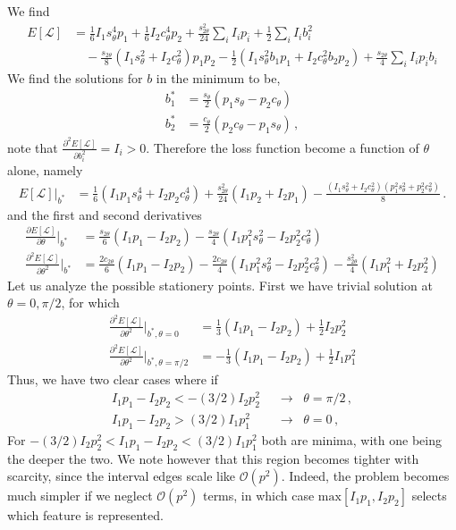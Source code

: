 \documentclass[a4paper]{article}
\begin{document}
We find
\begin{align}
E[\mathcal{L}] &= \frac{1}{6}I_1 s_\theta^4 p_1 + \frac{1}{6}I_2 c_\theta^4 p_2 
+ \frac{s_{2\theta}^2}{24}\sum_i I_i p_{\bar{i}} 
+ \frac{1}{2}\sum_i I_i b_i^2 \nonumber\\
&\quad - \frac{s_{2\theta}}{8}\left(I_1 s_\theta^2 + I_2 c_\theta^2\right)p_1 p_2 
- \frac{1}{2}\left(I_1 s_\theta^2 b_1 p_1 + I_2 c_\theta^2 b_2 p_2\right) 
+ \frac{s_{2\theta}}{4}\sum_i I_i p_{\bar i} b_i
\end{align}
We find the solutions for $b$ in the minimum to be,
\begin{align}
b_1^* &= \frac{s_\theta}{2}(p_1 s_\theta - p_2 c_\theta)\\
b_2^* &= \frac{c_\theta}{2}(p_2 c_\theta - p_1 s_\theta)\,,
\end{align}
note that $\frac{\partial^2 E[\mathcal{L}]}{\partial b_i^2}=I_i>0$. Therefore the loss function become a function of $\theta$ alone, namely
\begin{align}
E[\mathcal{L}]\big|_{b^*} &= \frac{1}{6}(I_1 p_1 s_\theta^4 + I_2 p_2 c_\theta^4) + \frac{s_{2\theta}^2}{24}(I_1 p_2 + I_2 p_1) - \frac{(I_1 s_\theta^2 + I_2 c_\theta^2)(p_1^2 s_\theta^2 + p_2^2 c_\theta^2)}{8}\,.
\end{align}
and the first and second derivatives
\begin{align}
\frac{\partial E[\mathcal{L}]}{\partial\theta}\Bigg|_{b^*} &= \frac{s_{2\theta}}{6}(I_1 p_1 - I_2 p_2) - \frac{s_{2\theta}}{4}(I_1 p_1^2 s_\theta^2 - I_2 p_2^2 c_\theta^2)
\\
\frac{\partial^2 E[\mathcal{L}]}{\partial\theta^2}\Bigg|_{b^*} &= \frac{2c_{2\theta}}{6}(I_1 p_1 - I_2 p_2) - \frac{2c_{2\theta}}{4}(I_1 p_1^2 s_\theta^2 - I_2 p_2^2 c_\theta^2) - \frac{s_{2\theta}^2}{4}(I_1 p_1^2 + I_2 p_2^2)
\end{align}
Let us analyze the possible stationery points. First we have trivial solution at $\theta=0,\pi/2$, for which
\begin{align}
\frac{\partial^2 E[\mathcal{L}]}{\partial\theta^2}\Bigg|_{b^*,\theta=0} &= \frac{1}{3}(I_1 p_1 - I_2 p_2) +\frac{1}{2}I_2 p_2^2
\\
\frac{\partial^2 E[\mathcal{L}]}{\partial\theta^2}\Bigg|_{b^*,\theta=\pi/2} &= -\frac{1}{3}(I_1 p_1 - I_2 p_2) +\frac{1}{2}I_1 p_1^2  
\end{align}
Thus, we have two clear cases where if
\begin{align}
I_1p_1- I_2 p_2 < -(3/2) I_2 p_2^2 \;\; &\to \;\; \theta=\pi/2\,,
\\
I_1p_1 - I_2 p_2 > (3/2) I_1 p_1^2 \;\; &\to \;\; \theta=0\,,
\end{align}
For $-(3/2) I_2 p_2^2<I_1p_1 - I_2 p_2 < (3/2) I_1 p_1^2$ both are minima, with one being the deeper the two. We note however that this region becomes tighter with scarcity, since the interval edges scale like $\mathcal{O}(p^2)$. Indeed, the problem becomes much simpler if we neglect $\mathcal{O}(p^2)$ terms, in which case $\text{max}[I_1 p_1,I_2 p_2]$ selects which feature is represented. 
\end{document}
